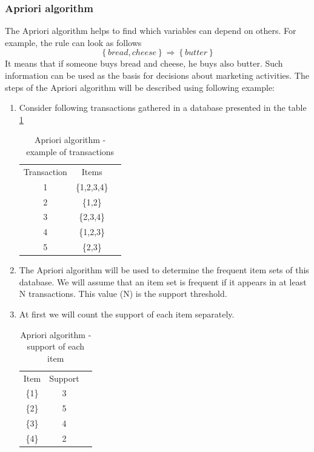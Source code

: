 \subsubsection{Apriori algorithm}
The Apriori algorithm helps to find which variables can depend on others. 
For example, the rule can look as follows \[\left \{ bread, cheese \right \} \Rightarrow \left \{ butter \right \}\] 
It means that if someone buys bread and cheese, he buys also butter. Such information can
be used as the basis for decisions about marketing activities.
The steps of the Apriori algorithm will be described using following example:
\begin{enumerate}
	\item Consider following transactions gathered in a database presented in the table \ref{apriori-1}
	\begin{table}[H]
		\centering
		\caption{Apriori algorithm - example of transactions}
		\label{apriori-1}
		\begin{tabular}{|c|c|l}
			\cline{1-2}
			Transaction & Items       &  \\ \cline{1-2}
			1           & \{1,2,3,4\} &  \\ \cline{1-2}
			2           & \{1,2\}     &  \\ \cline{1-2}
			3           & \{2,3,4\}   &  \\ \cline{1-2}
			4           & \{1,2,3\}   &  \\ \cline{1-2}
			5           & \{2,3\}     &  \\ \cline{1-2}
		\end{tabular}
	\end{table}
	\item  The Apriori algorithm will be used to determine the frequent item sets of this database. We will assume that an item set is frequent if it appears in at least N transactions. This value (N) is the support threshold.
	\item At first we will count the support of each item separately.
	\begin{table}[H]
		\centering
		\caption{Apriori algorithm - support of each item}
		\label{apriori-2}
		\begin{tabular}{|c|c|l}
			\cline{1-2}
			Item  & Support      &  \\ \cline{1-2}
			\{1\} & 3			 &  \\ \cline{1-2}
			\{2\} & 5            &  \\ \cline{1-2}
			\{3\} & 4            &  \\ \cline{1-2}
			\{4\} & 2            &  \\ \cline{1-2}

\end{tabular}
\end{table}
\end{enumerate}
